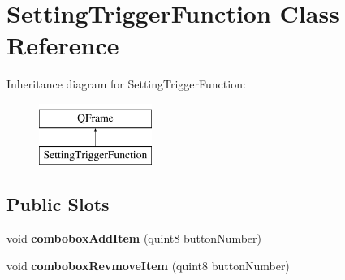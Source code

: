\hypertarget{class_setting_trigger_function}{}\section{Setting\+Trigger\+Function Class Reference}
\label{class_setting_trigger_function}
Inheritance diagram for Setting\+Trigger\+Function\+:\begin{figure}[H]
\begin{center}
\leavevmode
\includegraphics[height=2.000000cm]{class_setting_trigger_function}
\end{center}
\end{figure}
\subsection*{Public Slots}
\begin{DoxyCompactItemize}
\item 
\mbox{\label{class_setting_trigger_function_a825a4a51f969ca310512e5ea5b200c2f}} 
void {\bfseries combobox\+Add\+Item} (quint8 button\+Number)
\item 
\mbox{\label{class_setting_trigger_function_ab1f17c78e10b44740a5c911cc9e3d218}} 
void {\bfseries combobox\+Revmove\+Item} (quint8 button\+Number)
\end{DoxyCompactItemize}
